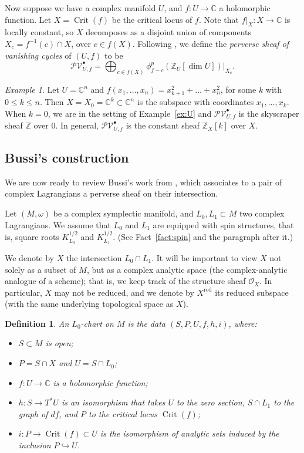 \documentclass [11pt]{amsart}
\newtheorem {definition}[theorem]{Definition}
\theoremstyle{remark}
\newtheorem {example}[theorem]{Example}
\def\zz {{\mathbb{Z}}}
\def\cc {{\mathbb{C}}}
\def\C{\cc}
\def\Z {\zz}
\def\O{\mathcal{O}}
\def\O {\mathcal{O}}
\def\PVb {\mathcal{PV}^\bullet}
\def\red {\operatorname{red}}
\def\Crit{\operatorname{Crit}}
\begin{document}
Now suppose we have a complex manifold $U$, and $f: U \to \C$ a holomorphic function. Let $X=\Crit(f)$ be the critical locus of $f$. Note that $f|_X : X \to \C$ is locally constant, so $X$ decomposes as a disjoint union of components $X_c=f^{-1}(c) \cap X$, over $c \in f(X)$. Following \cite[Definition 1.7]{Bussi}, we define the {\em perverse sheaf of vanishing cycles} of $(U, f)$ to be
\begin{equation}
\label{eq:PVb}
 \PVb_{U, f} = \bigoplus_{c \in f(X)} \phi^p_{f-c}(\Z_U[\dim U])|_{X_c}.
 \end{equation}

\begin{example}
\label{ex:PVclean}
Let $U =\C^n$ and $f(x_1, \dots, x_n)=x_{k+1}^2 + \dots + x_n^2$, for some $k$ with $0 \leq k \leq n$. Then $X = X_0 = \C^k \subset \C^n$ is the subspace with coordinates $x_1, \dots, x_k$. When $k=0$, we are in the setting of Example~\ref{ex:U} and $\PVb_{U,f}$ is the skyscraper sheaf $\Z$ over $0$. In general, $\PVb_{U,f}$ is the constant sheaf $\Z_X[k]$ over $X$.
\end{example}

\subsection{Bussi's construction}
\label{sec:Bussi}
We are now ready to review Bussi's work from \cite{Bussi}, which associates to a pair of complex Lagrangians a perverse sheaf on their intersection.

Let $(M,\omega)$ be a complex symplectic manifold, and $L_0, L_1 \subset M$ two complex Lagrangians. We assume that $L_0$ and $L_1$ are equipped with spin structures, that is, square roots $K_{L_0}^{1/2}$ and $K_{L_1}^{1/2}$. (See Fact~\ref{fact:spin} and the paragraph after it.) 

We denote by $X$ the intersection $L_0 \cap L_1$. It will be important to view $X$ not solely as a subset of $M$, but as a complex analytic space (the complex-analytic analogue of a scheme); that is, we keep track of the structure sheaf $\O_X$. In particular, $X$ may not be reduced, and we denote by $X^{\red}$ its reduced subspace (with the same underlying topological space as $X$).

\begin{definition}
\label{def:L0chart}
An {\em $L_0$-chart} on $M$ is the data $(S, P, U, f, h, i)$, where:
\begin{itemize}
\item $S \subset M$ is open; 
\item $P= S \cap X$ and $U=S \cap L_0$;
\item $f: U \to \C$ is a holomorphic function;
\item $h:S \to T^*U$ is an isomorphism that takes $U$ to the zero section, $S \cap L_1$ to the graph of $df$, and $P$ to the critical locus $\Crit(f)$;
\item $i: P \to \Crit(f) \subset U$ is the isomorphism of analytic sets induced by the inclusion $P \hookrightarrow U$.
\end{itemize}
\end{definition}
\end{document}
